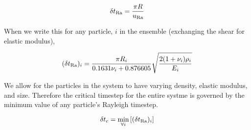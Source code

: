 \begin{equation}\label{eq:rayleigh-stability-time}
	\delta t_{\mathrm{Ra}} = \frac{\pi R}{u_{\mathrm{Ra}}}
\end{equation}

When we write this for any particle, $i$ in the ensemble (exchanging the shear for elastic modulus),

\begin{equation}\label{eq:rayleigh-timestep}
	(\delta t_{\mathrm{Ra}})_i = \frac{\pi R_i }{0.1631 \nu_i + 0.876605} \sqrt{\frac{2(1+\nu_i)\rho_i}{E_i}}
\end{equation}

We allow for the particles in the system to have varying density, elastic modulus, and size. Therefore the critical timestep for the entire systme is governed by the minimum value of any particle's Rayleigh timestep. 

\begin{equation}
	\delta t_c = \min_{\forall i}\left[(\delta t_{\mathrm{Ra}})_i\right]
\end{equation}





